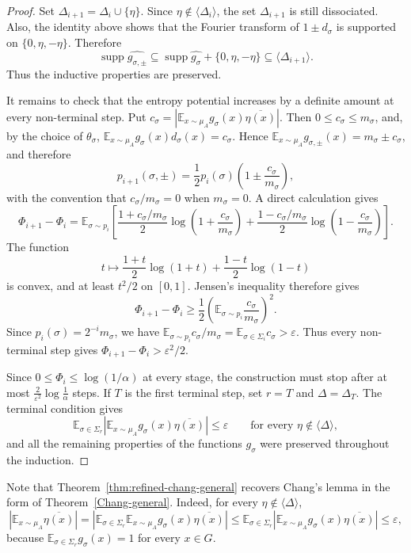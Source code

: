 \documentclass[11pt,reqno]{amsart}
\theoremstyle{plain}
\theoremstyle{remark}
\begin{document}
\begin{proof}
Set $\Delta_{i+1}=\Delta_i\cup\{\eta\}$. Since
$\eta\notin\langle\Delta_i\rangle$, the set $\Delta_{i+1}$ is still
dissociated. Also, the identity above shows that the Fourier transform of
$1\pm d_\sigma$ is supported on $\{0,\eta,-\eta\}$. Therefore
$$
\operatorname{supp}\widehat{g_{\sigma,\pm}}
\subseteq
\operatorname{supp}\widehat{g_\sigma}+\{0,\eta,-\eta\}
\subseteq
\langle\Delta_{i+1}\rangle.
$$
Thus the inductive properties are preserved.

It remains to check that the entropy potential increases by a definite amount
at every non-terminal step. Put
$
c_\sigma=
\left|
\mathbb E_{x\sim\mu_A}g_\sigma(x)\overline{\eta(x)}
\right|.
$
Then $0\le c_\sigma\le m_\sigma$, and, by the choice of $\theta_\sigma$,
$\mathbb E_{x\sim\mu_A}g_\sigma(x)d_\sigma(x)=c_\sigma$. Hence
$\mathbb E_{x\sim\mu_A}g_{\sigma,\pm}(x)=m_\sigma\pm c_\sigma$, and therefore
$$
p_{i+1}(\sigma,\pm)
=
\frac12 p_i(\sigma)
\left(1\pm\frac{c_\sigma}{m_\sigma}\right),
$$
with the convention that $c_\sigma/m_\sigma=0$ when $m_\sigma=0$. A direct
calculation gives
$$
\Phi_{i+1}-\Phi_i
=
\mathbb E_{\sigma\sim p_i}
\left[
\frac{1+c_\sigma/m_\sigma}{2}
\log\left(1+\frac{c_\sigma}{m_\sigma}\right)
+
\frac{1-c_\sigma/m_\sigma}{2}
\log\left(1-\frac{c_\sigma}{m_\sigma}\right)
\right].
$$
The function
$$
t\mapsto
\frac{1+t}{2}\log(1+t)
+
\frac{1-t}{2}\log(1-t)
$$
is convex, and at least $t^2/2$ on $[0,1]$. Jensen's
inequality therefore gives
$$
\Phi_{i+1}-\Phi_i
\ge
\frac12
\left(
\mathbb E_{\sigma\sim p_i}\frac{c_\sigma}{m_\sigma}
\right)^2.
$$
Since $p_i(\sigma)=2^{-i}m_\sigma$, we have
$\mathbb E_{\sigma\sim p_i}c_\sigma/m_\sigma
=
\mathbb E_{\sigma\in\Sigma_i}c_\sigma>\varepsilon$. Thus every non-terminal
step gives $\Phi_{i+1}-\Phi_i>\varepsilon^2/2$.

Since $0\le \Phi_i\le \log(1/\alpha)$ at every stage, the construction must
stop after at most
$
\frac{2}{\varepsilon^2}\log\frac1\alpha
$
steps. If $T$ is the first terminal step, set $r=T$ and
$\Delta=\Delta_T$. The terminal condition gives
$$
\mathbb E_{\sigma\in\Sigma_r}
\left|
\mathbb E_{x\sim\mu_A}g_\sigma(x)\overline{\eta(x)}
\right|
\le \varepsilon
\qquad\text{for every }\eta\notin\langle\Delta\rangle,
$$
and all the remaining properties of the functions $g_\sigma$ were preserved
throughout the induction.
\end{proof}
Note that Theorem~\ref{thm:refined-chang-general} recovers Chang's lemma in
the form of Theorem~\ref{Chang-general}. Indeed, for every
$\eta\notin\langle\Delta\rangle$,
$$
\left|\mathbb E_{x\sim\mu_A}\overline{\eta(x)}\right|
=
\left|
\mathbb E_{\sigma\in\Sigma_r}
\mathbb E_{x\sim\mu_A}g_\sigma(x)\overline{\eta(x)}
\right|
\le
\mathbb E_{\sigma\in\Sigma_r}
\left|
\mathbb E_{x\sim\mu_A}g_\sigma(x)\overline{\eta(x)}
\right|
\le \varepsilon,
$$
because $\mathbb E_{\sigma\in\Sigma_r}g_\sigma(x)=1$ for every $x\in G$.
\end{document}
